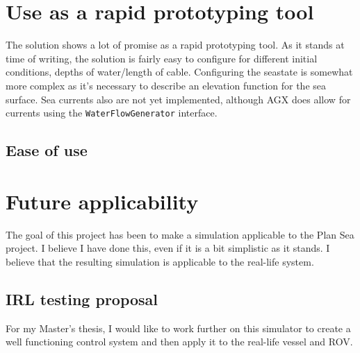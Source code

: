\section{Use as a rapid prototyping tool}
The solution shows a lot of promise as a rapid prototyping tool. As it stands at time of writing, the solution is fairly easy to configure for different initial conditions, depths of water/length of cable. Configuring the seastate is somewhat more complex as it's necessary to describe an elevation function for the sea surface. Sea currents also are not yet implemented, although AGX does allow for currents using the \texttt{WaterFlowGenerator} interface. 


\subsection{Ease of use}

\section{Future applicability}
The goal of this project has been to make a simulation applicable to the Plan Sea project. I believe I have done this, even if it is a bit simplistic as it stands. I believe that the resulting simulation is applicable to the real-life system. 

\subsection{IRL testing proposal}
For my Master's thesis, I would like to work further on this simulator to create a well functioning control system and then apply it to the real-life vessel and ROV. 